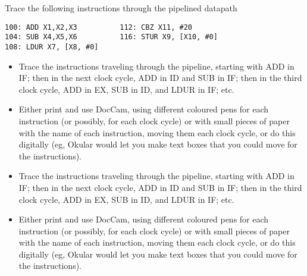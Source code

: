 \begin{frame}[fragile]
  \bigskip
  \vfill
\SizeC
 \begin{tcolorbox}[enhanced,attach boxed title to top center={yshift=-3mm,yshifttext=-1mm},
  colback=red!5!white,colframe=red!75!black,colbacktitle=red!80!black,
  title=Try this,fonttitle=\bfseries,
  boxed title style={size=small,colframe=red!50!black} ]
  {\footnotesize
Trace the following instructions through the pipelined datapath

\begin{verbatim}
100: ADD X1,X2,X3          112: CBZ X11, #20
104: SUB X4,X5,X6          116: STUR X9, [X10, #0] 
108: LDUR X7, [X8, #0] 
\end{verbatim}
}
\end{tcolorbox}
\BNotes\ifnum{}
\begin{itemize}
\item Trace the instructions traveling through the pipeline, starting with ADD in IF; then in the next clock cycle, ADD in ID and SUB in IF; then in the third clock cycle, ADD in EX, SUB in ID, and LDUR in IF; etc.
  \item Either print and use DocCam, using different coloured pens for each instruction (or possibly, for each clock cycle) or with small pieces of paper with the name of each instruction, moving them each clock cycle, or do this digitally (eg, Okular would let you make text boxes that you could move for the instructions).
\end{itemize}
\fi\ENotes
\end{frame}


\begin{frame}[fragile]
  \bigskip
  \vfill
\SizeC
 

\BNotes\ifnum{}
\begin{itemize}
\item Trace the instructions traveling through the pipeline, starting with ADD in IF; then in the next clock cycle, ADD in ID and SUB in IF; then in the third clock cycle, ADD in EX, SUB in ID, and LDUR in IF; etc.
  \item Either print and use DocCam, using different coloured pens for each instruction (or possibly, for each clock cycle) or with small pieces of paper with the name of each instruction, moving them each clock cycle, or do this digitally (eg, Okular would let you make text boxes that you could move for the instructions).
\end{itemize}
\fi\ENotes
\end{frame}

